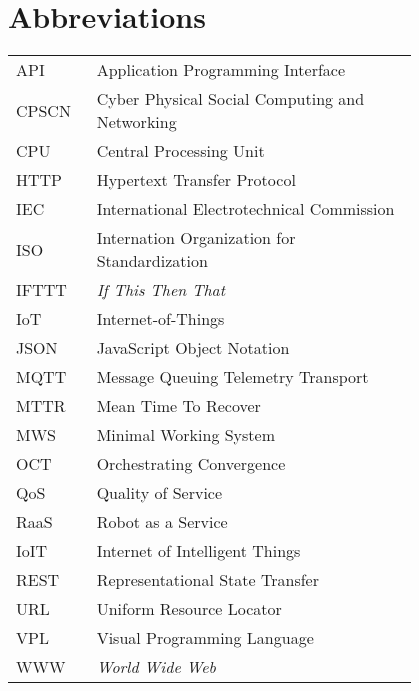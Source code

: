 \chapter*{Abbreviations}


\begin{flushleft}
\begin{tabular}{l p{0.8\linewidth}}
API      & Application Programming Interface\\
CPSCN    & Cyber Physical Social Computing and Networking\\
CPU      & Central Processing Unit\\
HTTP     & Hypertext Transfer Protocol\\
IEC      & International Electrotechnical Commission\\
ISO      & Internation Organization for Standardization\\
IFTTT    & \textit{If This Then That}\\
IoT      & Internet-of-Things\\
JSON     & JavaScript Object Notation\\
MQTT     & Message Queuing Telemetry Transport\\
MTTR     & Mean Time To Recover\\
MWS      & Minimal Working System\\
OCT      & Orchestrating Convergence\\
QoS      & Quality of Service\\
RaaS     & Robot as a Service\\
IoIT     & Internet of Intelligent Things\\
REST     & Representational State Transfer\\
URL      & Uniform Resource Locator\\
VPL      & Visual Programming Language\\
WWW      & \textit{World Wide Web}\\
\end{tabular}
\end{flushleft}

